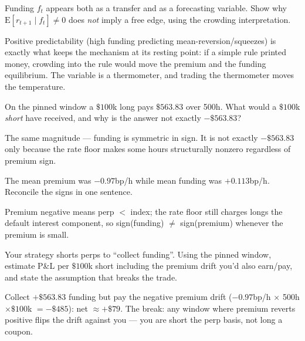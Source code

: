 \begin{exercise}[hard]
Funding $f_t$ appears both as a transfer and as a forecasting variable. Show why
$\mathrm{E}[r_{t+1}\mid f_t] \neq 0$ does \emph{not} imply a free edge, using the crowding
interpretation.
\end{exercise}
\begin{solution}
Positive predictability (high funding predicting mean-reversion/squeezes) is exactly what
keeps the mechanism at its resting point: if a simple rule printed money, crowding into the
rule would move the premium and the funding equilibrium. The variable is a thermometer, and
trading the thermometer moves the temperature.
\end{solution}

\begin{exercise}[easy]
On the pinned window a $\$100$k long pays $\$563.83$ over 500h.
What would a $\$100$k \emph{short} have received, and why is the
answer not exactly $-\$563.83$?
\end{exercise}
\begin{solution}
The same magnitude --- funding is symmetric in sign. It is not
exactly $-\$563.83$ only because the rate floor makes some hours
structurally nonzero regardless of premium sign.
\end{solution}
\begin{exercise}[medium]
The mean premium was $-0.97$bp/h while mean funding was
$+0.113$bp/h. Reconcile the signs in one sentence.
\end{exercise}
\begin{solution}
Premium negative means perp $<$ index; the rate floor still
charges longs the default interest component, so sign(funding)
$\neq$ sign(premium) whenever the premium is small.
\end{solution}
\begin{exercise}[hard]
Your strategy shorts perps to ``collect funding''. Using the pinned
window, estimate P\&L per $\$100$k short including the premium drift
you'd also earn/pay, and state the assumption that breaks the
trade.
\end{exercise}
\begin{solution}
Collect $+\$563.83$ funding but pay the negative premium drift
($-0.97$bp/h $\times$ 500h $\times \$100$k $= -\$485$): net
$\approx +\$79$. The break: any window where premium reverts
positive flips the drift against you --- you are short the perp
basis, not long a coupon.
\end{solution}

